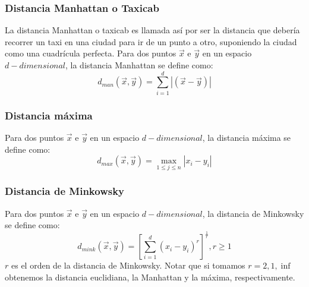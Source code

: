 \subsubsection{Distancia Manhattan o Taxicab}
La distancia Manhattan o taxicab es llamada así por ser la distancia que debería recorrer un taxi en una ciudad para ir de un punto a otro, suponiendo la ciudad como una cuadrícula perfecta.
Para dos puntos $\vec{x}$ e $\vec{y}$ en un espacio $d-dimensional$, la distancia Manhattan se define como:
\begin{equation}
	d_{man}(\vec{x}, \vec{y}) = \sum\limits_{i=1}^d |(\vec{x}-\vec{y})|
\end{equation}
\subsubsection{Distancia máxima}
Para dos puntos $\vec{x}$ e $\vec{y}$ en un espacio $d-dimensional$, la distancia máxima se define como:
\begin{equation}
	d_{max}(\vec{x}, \vec{y}) = \max_{1 \leq j \leq n} |x_i-y_i|
\end{equation}
\subsubsection{Distancia de Minkowsky}
Para dos puntos $\vec{x}$ e $\vec{y}$ en un espacio $d-dimensional$, la distancia de Minkowsky se define como:
\begin{equation}
	d_{mink}(\vec{x}, \vec{y}) = [\sum\limits_{i=1}^d (x_i-y_i)^r]^\frac{1}{r}, r \geq 1
\end{equation}
$r$ es el orden de la distancia de Minkowsky. Notar que si tomamos $r = 2,1,\inf$ obtenemos la distancia euclidiana, la Manhattan y la máxima, respectivamente.
